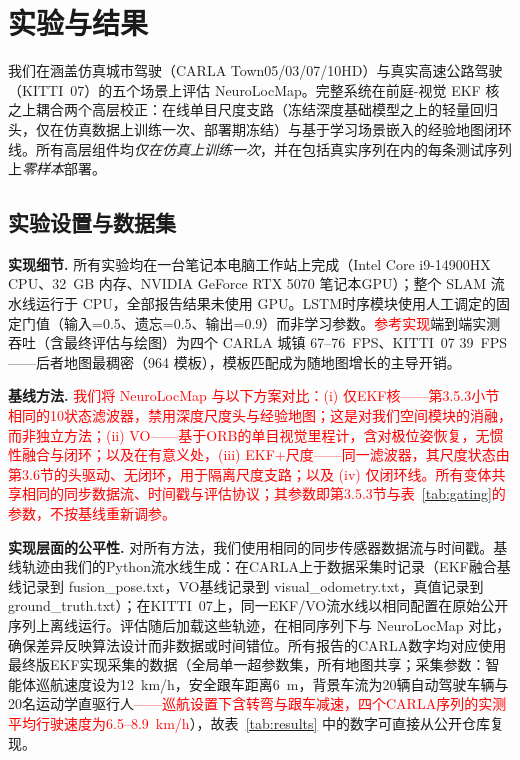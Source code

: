 \renewcommand{\topfraction}{0.85}       %
\renewcommand{\textfraction}{0.10}      %
\renewcommand{\floatpagefraction}{0.75} %


\section{实验与结果}
\label{sec:experiments}

我们在涵盖仿真城市驾驶（CARLA Town05/03/07/10HD）与真实高速公路驾驶（KITTI~07）的五个场景上评估 NeuroLocMap。完整系统在前庭-视觉 EKF 核之上耦合两个高层校正：在线单目尺度支路（冻结深度基础模型之上的轻量回归头，仅在仿真数据上训练一次、部署期冻结）与基于学习场景嵌入的经验地图闭环线。所有高层组件均\emph{仅在仿真上训练一次}，并在包括真实序列在内的每条测试序列上\emph{零样本}部署。

\subsection{实验设置与数据集}

\textbf{实现细节.} 所有实验均在一台笔记本电脑工作站上完成（Intel Core i9-14900HX CPU、32~GB 内存、NVIDIA GeForce RTX 5070 笔记本GPU）；整个 SLAM 流水线运行于 CPU，全部报告结果未使用 GPU。LSTM时序模块使用人工调定的固定门值（输入=0.5、遗忘=0.5、输出=0.9）而非学习参数。\textcolor{red}{参考实现}端到端实测吞吐（含最终评估与绘图）为四个 CARLA 城镇 67--76~FPS、KITTI~07 39~FPS——后者地图最稠密（964 模板），模板匹配成为随地图增长的主导开销。

\textbf{基线方法.} \textcolor{red}{我们将 NeuroLocMap 与以下方案对比：(i) 仅EKF核——第3.5.3小节相同的10状态滤波器，禁用深度尺度头与经验地图；这是对我们空间模块的消融，而非独立方法；(ii) VO——基于ORB的单目视觉里程计，含对极位姿恢复，无惯性融合与闭环；以及在有意义处，(iii) EKF+尺度——同一滤波器，其尺度状态由第3.6节的头驱动、无闭环，用于隔离尺度支路；以及 (iv) 仅闭环线。所有变体共享相同的同步数据流、时间戳与评估协议；其参数即第3.5.3节与表~\ref{tab:gating}的参数，不按基线重新调参。}

\textbf{实现层面的公平性.} 对所有方法，我们使用相同的同步传感器数据流与时间戳。基线轨迹由我们的Python流水线生成：在CARLA上于数据采集时记录（EKF融合基线记录到 fusion\_pose.txt，VO基线记录到 visual\_odometry.txt，真值记录到 ground\_truth.txt）；在KITTI~07上，同一EKF/VO流水线以相同配置在原始公开序列上离线运行。评估随后加载这些轨迹，在相同序列下与 NeuroLocMap 对比，确保差异反映算法设计而非数据或时间错位。所有报告的CARLA数字均对应使用最终版EKF实现采集的数据（全局单一超参数集，所有地图共享；采集参数：智能体巡航速度设为12~km/h，安全跟车距离6~m，背景车流为20辆自动驾驶车辆与20名运动学直驱行人\textcolor{red}{——巡航设置下含转弯与跟车减速，四个CARLA序列的实测平均行驶速度为6.5--8.9~km/h}），故表~\ref{tab:results} 中的数字可直接从公开仓库复现。

